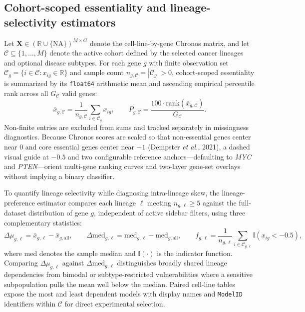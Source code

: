 \documentclass[11pt,a4paper]{article}
\begin{document}
\subsection{Cohort-scoped essentiality and lineage-selectivity estimators}
Let $\mathbf{X} \in (\mathbb{R} \cup \{\mathrm{NA}\})^{M \times G}$ denote the cell-line-by-gene Chronos matrix, and let $\mathcal{C} \subseteq \{1,\dots,M\}$ denote the active cohort defined by the selected cancer lineages and optional disease subtypes. For each gene $g$ with finite observation set $\mathcal{C}_g = \{i \in \mathcal{C} : x_{ig} \in \mathbb{R}\}$ and sample count $n_{g,\mathcal{C}} = |\mathcal{C}_g| > 0$, cohort-scoped essentiality is summarized by its \texttt{float64} arithmetic mean and ascending empirical percentile rank across all $G_{\mathcal{C}}$ valid genes:
\begin{equation}
\bar{x}_{g,\mathcal{C}} = \frac{1}{n_{g,\mathcal{C}}} \sum_{i \in \mathcal{C}_g} x_{ig}, \qquad
P_{g,\mathcal{C}} = \frac{100 \cdot \mathrm{rank}(\bar{x}_{g,\mathcal{C}})}{G_{\mathcal{C}}}.
\end{equation}
Non-finite entries are excluded from sums and tracked separately in missingness diagnostics. Because Chronos scores are scaled so that non-essential genes center near $0$ and core essential genes center near $-1$ (Dempster \textit{et al.}, 2021), a dashed visual guide at $-0.5$ and two configurable reference anchors---defaulting to \textit{MYC} and \textit{PTEN}---orient multi-gene ranking curves and two-layer gene-set overlays without implying a binary classifier.

To quantify lineage selectivity while diagnosing intra-lineage skew, the lineage-preference estimator compares each lineage $\ell$ meeting $n_{g,\ell} \ge 5$ against the full-dataset distribution of gene $g$, independent of active sidebar filters, using three complementary statistics:
\begin{equation}
\Delta\mu_{g,\ell} = \bar{x}_{g,\ell} - \bar{x}_{g,\mathrm{all}}, \qquad
\Delta\mathrm{med}_{g,\ell} = \mathrm{med}_{g,\ell} - \mathrm{med}_{g,\mathrm{all}}, \qquad
f_{g,\ell} = \frac{1}{n_{g,\ell}} \sum_{i \in \mathcal{C}_{g,\ell}} \mathbb{I}(x_{ig} < -0.5),
\end{equation}
where $\mathrm{med}$ denotes the sample median and $\mathbb{I}(\cdot)$ is the indicator function. Comparing $\Delta\mu_{g,\ell}$ against $\Delta\mathrm{med}_{g,\ell}$ distinguishes broadly shared lineage dependencies from bimodal or subtype-restricted vulnerabilities where a sensitive subpopulation pulls the mean well below the median. Paired cell-line tables expose the most and least dependent models with display names and \texttt{ModelID} identifiers within $\mathcal{C}$ for direct experimental selection.
\end{document}
